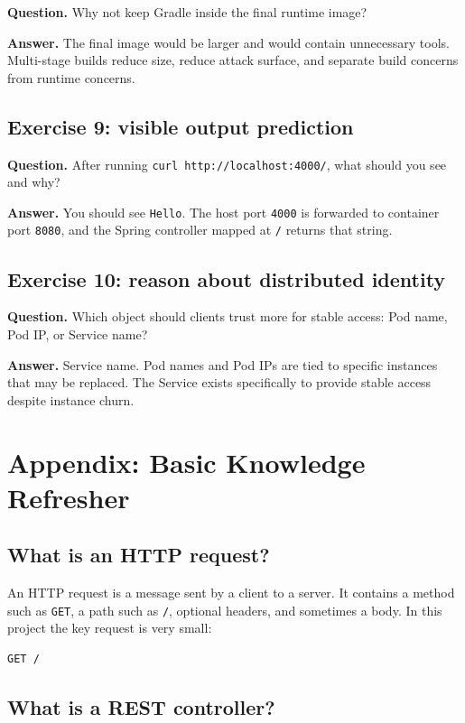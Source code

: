 \documentclass[a4paper,11pt]{article}
\begin{document}
\textbf{Question.} Why not keep Gradle inside the final runtime image?

\textbf{Answer.} The final image would be larger and would contain unnecessary tools. Multi-stage builds reduce size, reduce attack surface, and separate build concerns from runtime concerns.

\subsection*{Exercise 9: visible output prediction}

\textbf{Question.} After running \texttt{curl http://localhost:4000/}, what should you see and why?

\textbf{Answer.} You should see \texttt{Hello}. The host port \texttt{4000} is forwarded to container port \texttt{8080}, and the Spring controller mapped at \texttt{/} returns that string.

\subsection*{Exercise 10: reason about distributed identity}

\textbf{Question.} Which object should clients trust more for stable access: Pod name, Pod IP, or Service name?

\textbf{Answer.} Service name. Pod names and Pod IPs are tied to specific instances that may be replaced. The Service exists specifically to provide stable access despite instance churn.

\section{Appendix: Basic Knowledge Refresher}

\subsection{What is an HTTP request?}

An HTTP request is a message sent by a client to a server. It contains a method such as \texttt{GET}, a path such as \texttt{/}, optional headers, and sometimes a body. In this project the key request is very small:

\begin{lstlisting}[style=terminal]
GET /
\end{lstlisting}

\subsection{What is a REST controller?}
\end{document}
